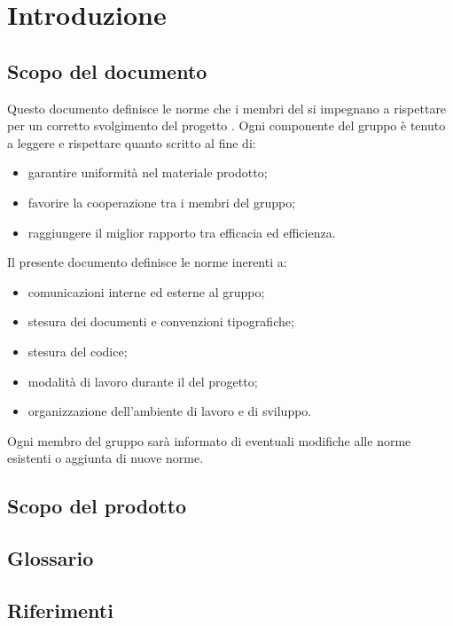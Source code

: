 \section{Introduzione}
    \subsection{Scopo del documento}
    Questo documento definisce le norme che i membri del  \zephyrus{} si impegnano a rispettare per un corretto svolgimento del progetto \progetto{}. Ogni componente del gruppo è tenuto a leggere e rispettare quanto scritto al fine di:
    \begin{itemize}
        \item garantire uniformità nel materiale prodotto;
        \item favorire la cooperazione tra i membri del gruppo;
        \item raggiungere il miglior rapporto tra efficacia ed efficienza.
    \end{itemize}
    Il presente documento definisce le norme inerenti a:
    \begin{itemize}
        \item comunicazioni interne ed esterne al gruppo;
        \item stesura dei documenti e convenzioni tipografiche;
        \item stesura del codice;
        \item modalità di lavoro durante il  del progetto;
        \item organizzazione dell'ambiente di lavoro e di sviluppo.
    \end{itemize}
    Ogni membro del gruppo sarà informato di eventuali modifiche alle norme esistenti o aggiunta di nuove norme.

    \subsection{Scopo del prodotto}
        \introScopo

    \subsection{Glossario}
        \introGlossario

    \subsection{Riferimenti}
